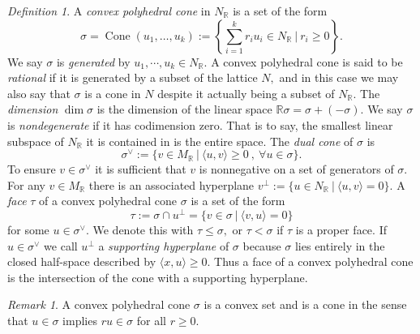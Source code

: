 \documentclass[BSc]{usydthesis}
\numberwithin{equation}{chapter}
\theoremstyle{remark}
\newtheorem{Definition}[equation]{Definition}
\newtheorem{Remark}[equation]{Remark}
\newcommand{\R}{\mathbb{R}}
\newcommand{\V}{\vee}
\DeclareMathOperator{\Cone}{Cone}
\begin{document}
\begin{Definition} \label{ConeDefs} A {\em convex polyhedral cone} in $N_{\R}$ is a set of the form $$ \sigma = \Cone(u_1,\ldots, u_k):= \left\{ \sum_{i=1}^k r_i u_i \in N_{\R} \  \bigg|  \ r_i \geq 0 \right\}.$$ We say $\sigma$ is {\em generated} by $u_1, \cdots, u_k \in N_{\R}.$  A convex polyhedral cone is said to be {\em rational} if it is generated by a subset of the lattice $N,$ and in this case we may also say that $\sigma$ is a cone in $N$ despite it actually being a subset of $N_{\R}.$ The {\em dimension} $\dim \sigma$ is the dimension of the linear space $\R \sigma = \sigma + (-\sigma).$ We say $\sigma$ is {\em nondegenerate} if it has codimension zero. That is to say, the smallest linear subspace of $N_{\R}$ it is contained in is the entire space. The {\em dual cone} of $\sigma$ is  $$\sigma^{\V} := \{ v\in M_{\R} \ | \ \langle u, v \rangle \geq 0 \ , \ \forall u \in \sigma \}.$$ To ensure $v \in \sigma^{\V}$ it is sufficient that $v$ is nonnegative on a set of generators of $\sigma.$ For any $v\in M_{\R}$ there is an associated hyperplane $v^{\perp} := \{ u \in N_{\R} \ | \ \langle u, v \rangle =0 \}.$ A {\em face} $\tau$ of a convex polyhedral cone $\sigma$ is a set of the form $$\tau := \sigma \cap u^{\perp} =\{ v\in \sigma \ | \ \langle v, u \rangle =0 \}$$ for some $u\in \sigma^{\V}.$ We denote this with $\tau \leq \sigma,$ or $\tau < \sigma$ if $\tau$ is a proper face. If $u\in \sigma^{\V}$ we call $u^{\perp}$ a {\em supporting hyperplane} of $\sigma$ because $\sigma$ lies entirely in the closed half-space described by $\langle x , u \rangle \geq 0.$ Thus a face of a convex polyhedral cone is the intersection of the cone with a supporting hyperplane.

\end{Definition}

\begin{Remark} A convex polyhedral cone $\sigma$ is a convex set and is a cone in the sense that $u\in \sigma$ implies $ru\in \sigma$ for all $r\geq 0.$
\end{Remark}
\end{document}
